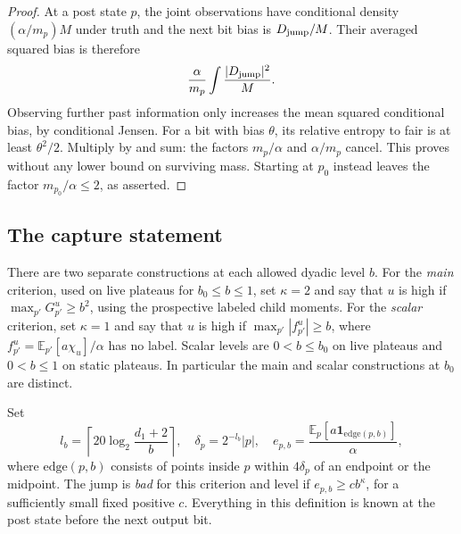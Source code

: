 \begin{proof}
At a post state $p$, the joint observations have conditional density
$(\alpha/m_p)M$ under truth and the next bit bias is $D_{\rm jump}/M$.
Their averaged squared bias is therefore
\[
 \frac{\alpha}{m_p}\int\frac{|D_{\rm jump}|^2}{M}.
\]
Observing further past information only increases the mean squared
conditional bias, by conditional Jensen. For a bit with bias $\theta$,
its relative entropy to fair is at least $\theta^2/2$. Multiply by
 and sum: the factors $m_p/\alpha$ and
$\alpha/m_p$ cancel. This proves  without any
lower bound on surviving mass. Starting at $p_0$ instead leaves the factor
$m_{p_0}/\alpha\le2$, as asserted.
\end{proof}

\subsection{The capture statement}

There are two separate constructions at each allowed dyadic level $b$.
For the \emph{main} criterion, used on live plateaus for $b_0\le b\le1$,
set $\kappa=2$ and say that $u$ is high if
$\max_{p'}G_{p'}^u\ge b^2$, using the prospective labeled child moments.
For the \emph{scalar} criterion, set $\kappa=1$ and say that $u$ is high if
$\max_{p'}|f_{p'}^u|\ge b$, where
$f_{p'}^u=\mathbb E_{p'}[a\chi_u]/\alpha$ has no label. Scalar levels are
$0<b\le b_0$ on live plateaus and $0<b\le1$ on static plateaus. In
particular the main and scalar constructions at $b_0$ are distinct.

Set
\begin{equation}\label{eq:07-edge-definition}
 l_b=\left\lceil20\log_2\frac{d_1+2}{b}\right\rceil,
 \quad \delta_p=2^{-l_b}|p|,
 \quad e_{p,b}=\frac{\mathbb E_p[a\mathbf1_{\mathrm{edge}(p,b)}]}{\alpha},
\end{equation}
where $\mathrm{edge}(p,b)$ consists of points inside $p$ within
$4\delta_p$ of an endpoint or the midpoint. The jump is \emph{bad} for
this criterion and level if $e_{p,b}\ge c b^\kappa$, for a sufficiently
small fixed positive $c$. Everything in this definition is known at the
post state before the next output bit.

